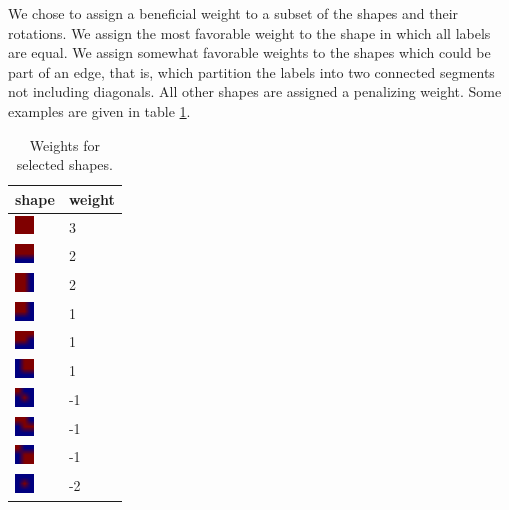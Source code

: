 \documentclass[12pt]{article}
\begin{document}
We chose to assign a beneficial weight to a subset of the shapes and their
rotations. We assign the most favorable weight to the shape in which all labels
are equal. We assign somewhat favorable weights to the shapes which could be
part of an edge, that is, which partition the labels into two connected
segments not including diagonals. All other shapes are assigned a penalizing
weight. Some examples are given in table \ref{table:shapes}.

\begin{table}
    \begin{center}
    \begin{tabular}{| l | l |}
        \hline
        shape & weight \\ \hline
        \includegraphics[width=5mm]{shapes/255.png} & 3\\
        \includegraphics[width=5mm]{shapes/31.png} & 2\\
        \includegraphics[width=5mm]{shapes/107.png} & 2\\
        \includegraphics[width=5mm]{shapes/11.png} & 1\\
        \includegraphics[width=5mm]{shapes/15.png} & 1\\
        \includegraphics[width=5mm]{shapes/22.png} & 1\\
        \includegraphics[width=5mm]{shapes/1.png} & -1\\
        \includegraphics[width=5mm]{shapes/19.png} & -1\\
        \includegraphics[width=5mm]{shapes/209.png} & -1\\
        \includegraphics[width=5mm]{shapes/0.png} & -2\\
        \hline
    \end{tabular}
    \end{center}
    \caption{Weights for selected shapes.}
    \label{table:shapes}
\end{table}
\end{document}
